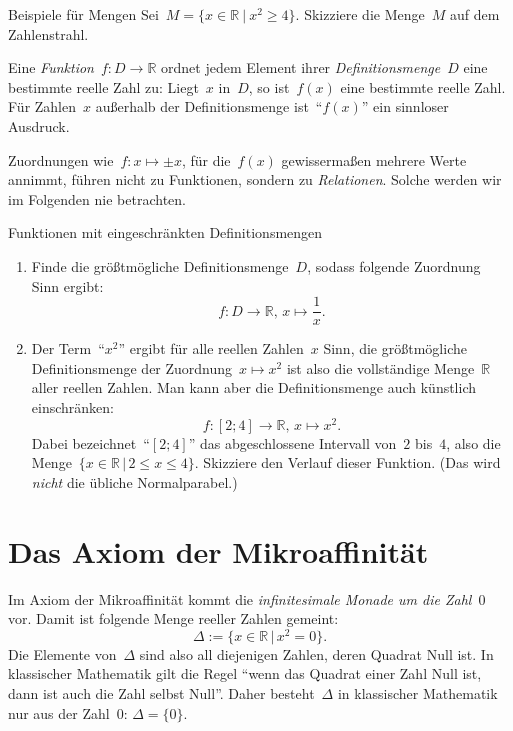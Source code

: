 \documentclass{zirkelblatt}
\newcommand{\RR}{\mathbb{R}}
\theoremstyle{definition}
\theoremstyle{plain}
\theoremstyle{remark}
\begin{document}
\begin{aufgabeShaded}{Beispiele für Mengen}
Sei~$M = \{ x \in \RR \ |\ x^2 \geq 4 \}$. Skizziere die Menge~$M$ auf dem
Zahlenstrahl.
\end{aufgabeShaded}

Eine \emph{Funktion}~$f : D \to \RR$ ordnet jedem Element ihrer
\emph{Definitionsmenge}~$D$ eine bestimmte reelle Zahl zu: Liegt~$x$ in~$D$, so
ist~$f(x)$ eine bestimmte reelle Zahl. Für Zahlen~$x$ außerhalb der
Definitionsmenge ist~"`$f(x)$"' ein sinnloser Ausdruck.

Zuordnungen wie~$f : x \mapsto \pm x$, für die~$f(x)$ gewissermaßen
mehrere Werte annimmt, führen nicht zu Funktionen, sondern zu \emph{Relationen}.
Solche werden wir im Folgenden nie betrachten.

\begin{aufgabeShaded}{Funktionen mit eingeschränkten Definitionsmengen}
\begin{enumerate}
\item Finde die größtmögliche Definitionsmenge~$D$, sodass folgende Zuordnung
Sinn ergibt:
\[ f : D \to \RR,\,x \mapsto \frac{1}{x}. \]
\item Der Term~"`$x^2$"' ergibt für alle reellen Zahlen~$x$ Sinn, die
größtmögliche Definitionsmenge der Zuordnung~$x \mapsto x^2$ ist also die
vollständige Menge~$\RR$ aller reellen Zahlen. Man kann aber die
Definitionsmenge auch künstlich einschränken:
\[ f : [2;4] \to \RR,\,x \mapsto x^2. \]
Dabei bezeichnet~"`$[2;4]$"' das abgeschlossene Intervall von~$2$ bis~$4$, also
die Menge~$\{ x \in \RR \,|\, 2 \leq x \leq 4 \}$. Skizziere den Verlauf dieser
Funktion. (Das wird \emph{nicht} die übliche Normalparabel.)
\end{enumerate}
\end{aufgabeShaded}


\section{Das Axiom der Mikroaffinität}

Im Axiom der Mikroaffinität kommt die \emph{infinitesimale Monade um die
Zahl~$0$} vor. Damit ist folgende Menge reeller Zahlen gemeint:
\[ \Delta := \{ x \in \RR \,|\, x^2 = 0 \}. \]
Die Elemente von~$\Delta$ sind also all diejenigen Zahlen, deren Quadrat Null
ist. In klassischer Mathematik gilt die Regel "`wenn das Quadrat einer Zahl
Null ist, dann ist auch die Zahl selbst Null"'. Daher besteht~$\Delta$ in klassischer
Mathematik nur aus der Zahl~$0$: $\Delta = \{ 0 \}$.
\end{document}
